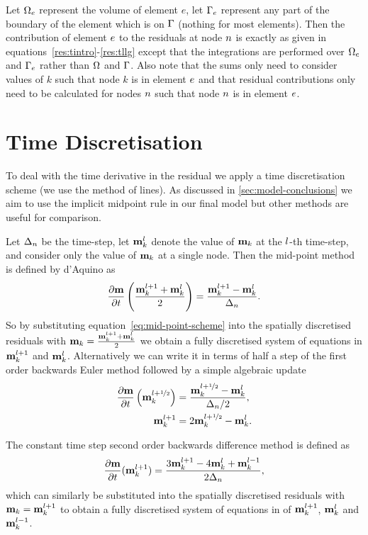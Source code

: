 Let $\Omega_e$ represent the volume of element $e$, let ${\Gamma}_e$ represent any part of the boundary of the element which is on ${\Gamma}$ (nothing for most elements). Then the contribution of element $e$ to the residuals at node $n$ is exactly as given in equations~\eqref{res:tintro}-\eqref{res:tllg} except that the integrations are performed over $\Omega_e$ and ${\Gamma}_e$ rather than $\Omega$ and ${\Gamma}$. Also note that the sums only need to consider values of $k$ such that node $k$ is in element $e$ and that residual contributions only need to be calculated for nodes $n$ such that node $n$ is in element $e$.


\section{Time Discretisation}
\label{sec:time-discretisation-resi}

To deal with the time derivative in the residual we apply a time discretisation scheme (\ie we use the method of lines). As discussed in \autoref{sec:model-conclusions} we aim to use the implicit midpoint rule in our final model but other methods are useful for comparison.

Let $\Delta_{n}$ be the time-step, let $\mathbf{m}_k^l$ denote the value of $\mathbf{m}_k$ at the $l$-th time-step, and consider only the value of $\mathbf{m}_k$ at a single node. Then the mid-point method is defined by d'Aquino\cite{DAquino2005} as
\begin{equation}
  \label{eq:mid-point-scheme}
  \frac{\partial \mathbf{m}}{\partial t} \left( \frac{\mathbf{m}_k^{l+1} + \mathbf{m}_k^l}{2} \right) = \frac{\mathbf{m}_k^{l+1} - \mathbf{m}_k^l}{ \Delta_{n}}.
\end{equation}
So by substituting equation~\eqref{eq:mid-point-scheme} into the spatially discretised residuals with $\mathbf{m}_k = \frac{\mathbf{m}_k^{l+1} + \mathbf{m}^l_k}{2}$ we obtain a fully discretised system of equations in  $\mathbf{m}_k^{l+1}$ and $\mathbf{m}_k^l$.
Alternatively we can write it in terms of half a step of the first order backwards Euler method followed by a simple algebraic update \cite{Malidi2005}
\begin{equation}
  \label{eq:imr-bdf1}
  \begin{aligned}
    \frac{\partial \mathbf{m}}{\partial t} \left(\mathbf{m}_k^{l+\nicefrac{1}{2}} \right) &= \frac{\mathbf{m}_k^{l+\nicefrac{1}{2}} - \mathbf{m}_k^{l}}{\Delta_{n}/2}, \\
    \mathbf{m}_k^{l+1} &= 2\mathbf{m}_k^{l+\nicefrac{1}{2}} - \mathbf{m}_k^l.
  \end{aligned}
\end{equation}


The constant time step second order backwards difference method is defined as\cite{Atkinson2009}
\begin{equation}
  \label{eq:bdf2-scheme}
  \frac{\partial \mathbf{m}}{\partial t}(\mathbf{m}_k^{l+1}) = \frac{3 \mathbf{m}_k^{l+1} - 4 \mathbf{m}_k^{l} + \mathbf{m}_k^{l-1}}{2\Delta_{n}},
\end{equation}
which can similarly be substituted into the spatially discretised residuals with $\mathbf{m}_k = \mathbf{m}_k^{l+1}$ to obtain a fully discretised system of equations in of $\mathbf{m}_k^{l+1}$, $\mathbf{m}_k^l$ and $\mathbf{m}_k^{l-1}$.


